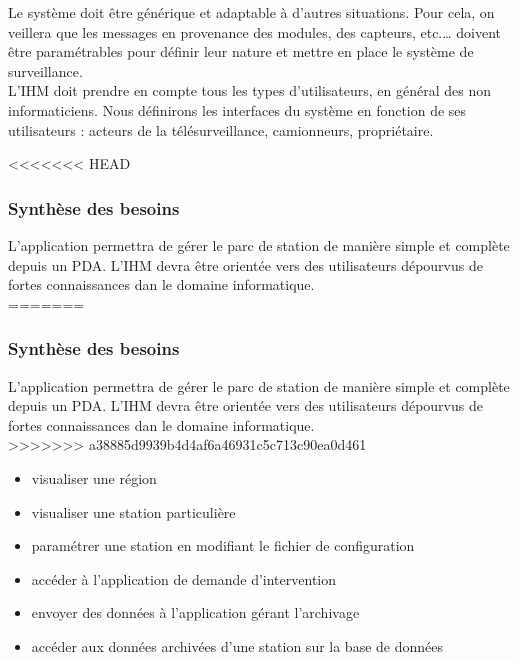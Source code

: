Le système doit être générique et adaptable à d’autres situations. Pour cela, on veillera que les 
messages en provenance des modules, des capteurs, etc.… doivent être paramétrables pour définir 
leur nature et mettre en place le système de surveillance.\\

L'IHM doit prendre en compte tous les types d'utilisateurs, en général des non informaticiens. 
Nous définirons les interfaces du système en fonction de ses utilisateurs : 
acteurs de la télésurveillance, camionneurs, propriétaire.
 


<<<<<<< HEAD
\subsubsection{Synthèse des besoins}
L'application permettra de gérer le parc de station de manière simple et complète depuis un PDA. 
L'IHM devra être orientée vers des utilisateurs dépourvus de fortes connaissances dan le domaine informatique.\\
=======
\subsubsection{Synthèse des besoins}
L'application permettra de gérer le parc de station de manière simple et complète depuis un PDA. L'IHM devra être orientée vers des utilisateurs dépourvus de fortes connaissances dan le domaine informatique.\\
>>>>>>> a38885d9939b4d4af6a46931c5c713c90ea0d461

\begin{itemize}
\item   visualiser une région \\
\item	visualiser une station particulière \\
\item	paramétrer une station en modifiant le fichier de configuration \\
\item	accéder à l'application de demande d'intervention \\
\item	envoyer des données à l'application gérant l'archivage\\ 
\item	accéder aux données archivées d'une station sur la base de données\\
\end{itemize}


